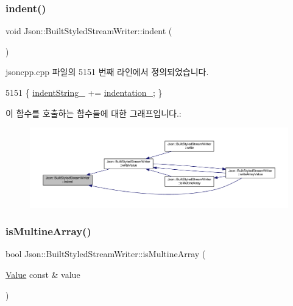 \subsubsection{\texorpdfstring{indent()}{indent()}}
{\footnotesize\ttfamily void Json\+::\+Built\+Styled\+Stream\+Writer\+::indent (\begin{DoxyParamCaption}{ }\end{DoxyParamCaption})\hspace{0.3cm}{\ttfamily [private]}}



jsoncpp.\+cpp 파일의 5151 번째 라인에서 정의되었습니다.


\begin{DoxyCode}
5151 \{ \hyperlink{struct_json_1_1_built_styled_stream_writer_a0f8115a4fb474ab0e9de25f10e5ca09a}{indentString\_} += \hyperlink{struct_json_1_1_built_styled_stream_writer_aaa4cbad91428ceca37cbabfc2a17a92d}{indentation\_}; \}
\end{DoxyCode}
이 함수를 호출하는 함수들에 대한 그래프입니다.\+:\nopagebreak
\begin{figure}[H]
\begin{center}
\leavevmode
\includegraphics[width=350pt]{struct_json_1_1_built_styled_stream_writer_a73e09692a2cfbd6e67836b060dc34a9f_icgraph}
\end{center}
\end{figure}
\mbox{\label{struct_json_1_1_built_styled_stream_writer_af423fd33b3d580506ea3efc53b05a077}} 
\subsubsection{\texorpdfstring{is\+Multine\+Array()}{isMultineArray()}}
{\footnotesize\ttfamily bool Json\+::\+Built\+Styled\+Stream\+Writer\+::is\+Multine\+Array (\begin{DoxyParamCaption}\item[{\hyperlink{class_json_1_1_value}{Value} const \&}]{value }\end{DoxyParamCaption})\hspace{0.3cm}{\ttfamily [private]}}



